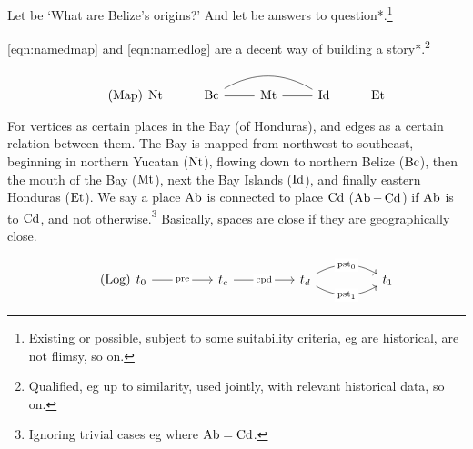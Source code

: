 	Let  be `What are Belize's origins?' And let  be answers to question*.\footnote{Existing or possible, subject to some suitability criteria, eg are historical, are not flimsy, so on.}
	
	\begin{clm}
	\label{clm:maindecency}
		\ref{eqn:namedmap} and \ref{eqn:namedlog} are a decent way of building a story*.\footnote{Qualified, eg up to similarity, used jointly, with relevant historical data, so on.}
	\end{clm}
	
	\begin{equation}
	\tag{Map}
	\label{eqn:namedmap}
		\begin{tikzcd}[arrows=dash]
		\nt &\bc \rar \ar[rr,bend left] &\mt \rar &\id &\et
		\end{tikzcd}
	\end{equation}
	
	For vertices as certain places in the Bay (of Honduras), and edges as a certain relation between them. The Bay is mapped from northwest to southeast, beginning in northern Yucatan (\(\operatorname{Nt}\)), flowing down to northern Belize (\(\operatorname{Bc}\)), then the mouth of the Bay (\(\operatorname{Mt}\)), next the Bay Islands (\(\operatorname{Id}\)), and finally eastern Honduras (\(\operatorname{Et}\)). We say a place \(\operatorname{Ab}\) is connected to place \(\operatorname{Cd}\) (\(\operatorname{Ab}-\operatorname{Cd}\)) if \(\operatorname{Ab}\) is  to \(\operatorname{Cd}\), and not otherwise.\footnote{Ignoring trivial cases eg where \(\operatorname{Ab}=\operatorname{Cd}\).} Basically, spaces are close if they are geographically close.
	
	\begin{equation}
	\tag{Log}
	\label{eqn:namedlog}
		\begin{tikzcd}[sep=huge]
		t_0 \rar["\pre" description] &t_c \rar["\cpd" description] &t_d \rar[bend left,"\pst_0" description] \rar[bend right,"\pst_1" description] &t_1
		\end{tikzcd}
	\end{equation}
	
